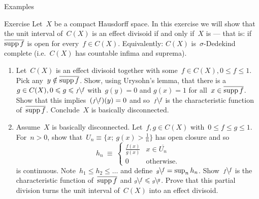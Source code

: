 \documentclass[b]{subfiles}
\begin{document}
\begin{parsec}
\begin{point}{Examples}
\end{point}
\begin{point}{Exercise}%
Let~$X$ be a compact Hausdorff space.
In this exercise we will show
    that the unit interval of~$C(X)$
    is an effect divisoid
    if and only if~$X$
    is 
    \cite[1H]{gillman2013rings}
    --- that is: if~$\overline{\operatorname{supp} f}$ is open
    for every~$f \in C(X)$.
Equivalently:
$C(X)$ is~$\sigma$-Dedekind complete
    \cite[3N.5]{gillman2013rings}
(i.e.~$C(X)$ has countable infima and suprema).
\begin{enumerate}
\item
    Let~$C(X)$ is an effect divisoid
        together with some~$f \in C(X), 0 \leq f \leq 1$.
    Pick any~$y \notin \overline{\operatorname{supp} f}$.
    Show, using Urysohn's lemma,
    that there is a~$g \in C(X), 0\leq g \leq \rfrac{f}{f}$
    with~$g(y) = 0$ and $g(x) = 1$ for all~$x \in \overline{\operatorname{supp} f}$.
    Show that this implies~$(\rfrac{f}{f})(y) = 0$
        and so~$\rfrac{f}{f}$ is the characteristic function
    of~$\overline{\operatorname{supp} f}$.  Conclude~$X$ is basically disconnected.
\item
Assume~$X$ is basically disconnected.
Let~$f,g\in C(X)$ with~$0 \leq f \leq g \leq 1$.
For~$n > 0$,
show that~$U_n \equiv \{ x;\ g(x) > \frac{1}{n} \}$
has open closure and so
\begin{equation*}
    h_n \ \equiv \  \begin{cases}
        \frac{f(x)}{g(x)} & x \in \overline{U_n}\\
        0 & \text{otherwise}.
    \end{cases}
\end{equation*}
is continuous.
Note~$h_1 \leq h_2 \leq \ldots $
    and define~$\rfrac{f}{g} = \sup_n h_n$.
Show~$\rfrac{f}{f}$ is the characteristic function
    of~$\overline{\operatorname{supp} f}$ and
    $\rfrac{f}{g} \leq \rfrac{g}{g}$.
Prove that this partial division turns the unit interval of~$C(X)$
    into an effect divisoid.
\end{enumerate}


\end{point}
\end{parsec}
\end{document}
